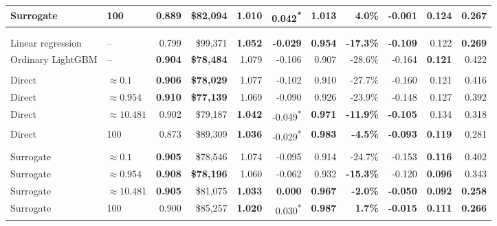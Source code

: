 \documentclass[10pt]{article}
\theoremstyle{definition}
\newcommand{\1}{\mathbf{1}}
\newenvironment{oldrevisionblock}{%
  \begingroup
  \begin{tcolorbox}[
    enhanced,breakable,
    colback=white,colframe=white,boxrule=0pt,
    left=0pt,right=0pt,top=1pt,bottom=1pt,
    coltext=blue,
    overlay unbroken={\draw[blue,line width=.45pt] (frame.south west)--(frame.north east);\draw[blue,line width=.45pt] (frame.north west)--(frame.south east);},
    overlay first={\draw[blue,line width=.45pt] (frame.south west)--(frame.north east);},
    overlay middle={\draw[blue,line width=.45pt] (frame.south west)--(frame.north east);},
    overlay last={\draw[blue,line width=.45pt] (frame.north west)--(frame.south east);}
  ]
}{\end{tcolorbox}\endgroup}
\begin{document}
\begin{oldrevisionblock}
{\begin{tabular}{llrrrrrrrrr}
Surrogate & 100 & 0.889 & \$82,094 & \textbf{1.010} & 0.042\textsuperscript{*} & \textbf{1.013} & \textbf{4.0\%} & \textbf{-0.001} & 0.124 & 0.267 \\
\midrule
\addlinespace[2pt]
\multicolumn{11}{l}{\textit{Panel B: 2025 forward evaluation}} \\
\addlinespace[2pt]
\multicolumn{11}{l}{\textbf{Baseline models}} \\
\cmidrule(lr){1-11}
Linear regression & -- & 0.799 & \$99,371 & \textbf{1.052} & \textbf{-0.029} & \textbf{0.954} & \textbf{-17.3\%} & \textbf{-0.109} & 0.122 & \textbf{0.269} \\
Ordinary LightGBM & -- & \textbf{0.904} & \textbf{\$78,484} & 1.079 & -0.106 & 0.907 & -28.6\% & -0.164 & \textbf{0.121} & 0.422 \\
\addlinespace[3pt]
\multicolumn{11}{l}{\textbf{Direct penalty}} \\
\cmidrule(lr){1-11}
Direct & $\approx0.1$ & \textbf{0.906} & \textbf{\$78,029} & 1.077 & -0.102 & 0.910 & -27.7\% & -0.160 & 0.121 & 0.416 \\
Direct & $\approx0.954$ & \textbf{0.910} & \textbf{\$77,139} & 1.069 & -0.090 & 0.926 & -23.9\% & -0.148 & 0.127 & 0.392 \\
Direct & $\approx10.481$ & 0.902 & \$79,187 & \textbf{1.042} & -0.049\textsuperscript{*} & \textbf{0.971} & \textbf{-11.9\%} & \textbf{-0.105} & 0.134 & 0.318 \\
Direct & 100 & 0.873 & \$89,309 & \textbf{1.036} & -0.029\textsuperscript{*} & \textbf{0.983} & \textbf{-4.5\%} & \textbf{-0.093} & \textbf{0.119} & 0.281 \\
\addlinespace[3pt]
\multicolumn{11}{l}{\textbf{Surrogate penalty}} \\
\cmidrule(lr){1-11}
Surrogate & $\approx0.1$ & \textbf{0.905} & \$78,546 & 1.074 & -0.095 & 0.914 & -24.7\% & -0.153 & \textbf{0.116} & 0.402 \\
Surrogate & $\approx0.954$ & \textbf{0.908} & \textbf{\$78,196} & 1.060 & -0.062 & 0.932 & \textbf{-15.3\%} & -0.120 & \textbf{0.096} & 0.343 \\
Surrogate & $\approx10.481$ & \textbf{0.905} & \$81,075 & \textbf{1.033} & \textbf{0.000} & \textbf{0.967} & \textbf{-2.0\%} & \textbf{-0.050} & \textbf{0.092} & \textbf{0.258} \\
Surrogate & 100 & 0.900 & \$85,257 & \textbf{1.020} & 0.030\textsuperscript{*} & \textbf{0.987} & \textbf{1.7\%} & \textbf{-0.015} & \textbf{0.111} & \textbf{0.266} \\
\bottomrule
\end{tabular}}

\end{oldrevisionblock}
\end{document}
